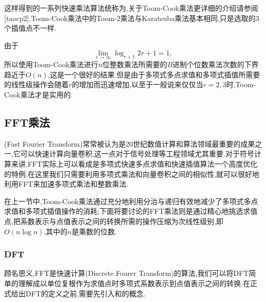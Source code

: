 \documentclass{ctexart}
\newcommand\mtcasCite[1]{[#1]}
\theoremstyle{remark}
\theoremstyle{definition}
\begin{document}
这样得到的一系列快速乘法算法统称为,关于Toom-Cook乘法更详细的介绍请参阅\mtcasCite{taocp2}.Toom-Cook乘法中的Toom-2乘法与Karatsuba乘法基本相同,只是选取的3个插值点不一样.

由于$$\lim_{r\rightarrow\infty}\log_{r+1}{2r+1}=1,$$所以使用Toom-Cook乘法进行$n$位整数乘法所需要的$B$进制个位数乘法次数的下界趋近于$O(n)$,这是一个很好的结果.但是由于多项式多点求值和多项式插值所需要的线性级操作会随着$r$的增加而迅速增加,以至于一般说来仅仅当$r=2,3$时,Toom-Cook乘法才是实用的.

\subsection{FFT乘法}

(Fast Fourier Transform)常常被认为是20世纪数值计算和算法领域最重要的成果之一,它可以快速计算向量卷积,这一点对于信号处理等工程领域尤其重要.对于符号计算来讲,FFT实际上可以看成是多项式快速多点求值和快速插值算法一个高度优化的特例.在这里我们只需要利用多项式乘法和向量卷积之间的相似性,就可以很好地利用FFT来加速多项式乘法和整数乘法.

在上一节中,Toom-Cook乘法通过充分地利用分治与递归有效地减少了多项式多点求值和多项式插值操作的消耗;下面将要讨论的FFT乘法则是通过精心地挑选求值点,把系数表示与点值表示之间的转换所需的操作压缩为次线性级别,即$O(n\log{n})$,其中的$n$是乘数的位数.

\subsubsection{DFT}

顾名思义,FFT是快速计算(Discrete Fourer Transform)的算法,我们可以将DFT简单的理解成以单位复根作为求值点时多项式系数表示到点值表示之间的转换.在正式给出DFT的定义之前,需要先引入和的概念.
\end{document}
